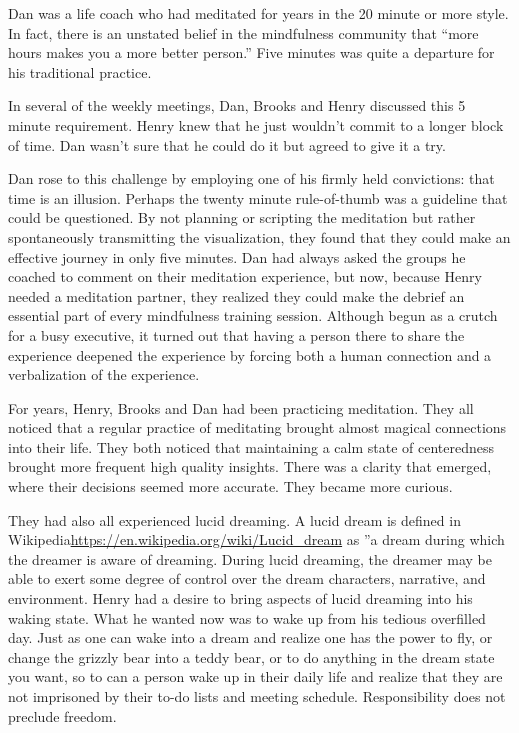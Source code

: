 \documentclass[12pt]{book}
\begin{document}
Dan was a life coach who had meditated for years in the 20 minute or more style. In fact, there is an unstated belief in the mindfulness community that “more hours makes you a more better person.” Five minutes was quite a departure for his traditional practice.
					
In several of the weekly meetings, Dan, Brooks and Henry discussed this 5 minute requirement. Henry knew that he just wouldn't commit to a longer block of time. Dan wasn't sure that he could do it but agreed to give it a try.
					
Dan rose to this challenge by employing one of his firmly held convictions: that time is an illusion. Perhaps the twenty minute rule-of-thumb was a guideline that could be questioned. By not planning or scripting the meditation but rather spontaneously transmitting the visualization, they found that they could make an effective journey in only five minutes. Dan had always asked the groups he coached to comment on their meditation experience, but now, because Henry needed a meditation partner, they realized they could make the debrief an essential part of every mindfulness training session. Although begun as a crutch for a busy executive, it turned out that having a person there to share the experience deepened the experience by forcing both a human connection and a verbalization of the experience.
					
For years,  Henry, Brooks and Dan had been practicing meditation. They all noticed that a regular practice of meditating brought almost magical connections into their life. They both noticed that maintaining a calm state of centeredness brought more frequent high quality insights. There was a clarity that emerged, where their decisions seemed more accurate. They became more curious.

					
They had also all  experienced lucid dreaming. A lucid dream is defined in Wikipedia\url{https://en.wikipedia.org/wiki/Lucid_dream} as ”a dream during which the dreamer is aware of dreaming. During lucid dreaming, the dreamer may be able to exert some degree of control over the dream characters, narrative, and environment. Henry had a desire to bring aspects of lucid dreaming into his waking state. What he wanted now was to wake up from his tedious overfilled day. Just as one can wake into a dream and realize one has the power to fly, or change the grizzly bear into a teddy bear, or to do anything in the dream state you want, so to can a person wake up in their daily life and realize that they are not imprisoned by their to-do lists and meeting schedule. Responsibility does not preclude freedom.
					
\end{document}
